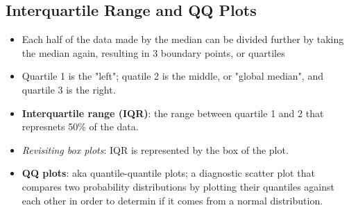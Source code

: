 \documentclass[12pt,a4paper]{article}
\begin{document}
\subsection{Interquartile Range and QQ Plots}
\begin{itemize}
    \item Each half of the data made by the median can be divided further by taking the median again, resulting in 3 boundary points, or {\color{o-Sun}quartiles}
    \item Quartile 1 is the "left"; quatile 2 is the middle, or "global median", and quartile 3 is the right.
    \item \textbf{Interquartile range (IQR)}: the range between quartile 1 and 2 that represnets 50\% of the data.
    \item \textit{Revisiting box plots}: IQR is represented by the box of the plot. 
    \item \textbf{QQ plots}: aka quantile-quantile plots; a diagnostic scatter plot that compares two probability distributions by plotting their quantiles against each other in order to determin if it comes from a normal distribution.
\end{itemize}
\end{document}
